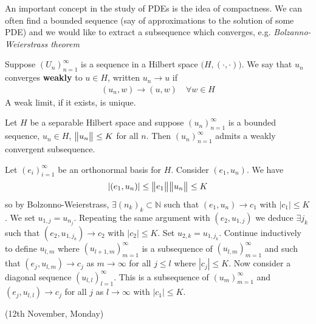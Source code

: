 \documentclass[12pt,a4paper]{report}
\newenvironment{proof}
{\begin{changemargin}{1cm}{0.5cm} 
	}%
	{\end{changemargin}
}
\begin{document}
An important concept in the study of PDEs is the idea of compactness. We can often find a bounded sequence (say of approximations to the solution of some PDE) and we would like to extract a subsequence which converges, e.g. \emph{Bolzanno-Weierstrass theorem}
\s

 Suppose $(U_n)_{n=1}^{\infty}$ is a sequence in a Hilbert space $\big( H,(\cdot,\cdot) \big)$. We say that $u_n$ converges \textbf{weakly} to $u\in H$, written $u_n \rightarrow u$ if
\begin{align*}
(u_n, w) \rightarrow (u,w) \quad \forall w\in H
\end{align*}
A weak limit, if it exists, is unique.
\s

\thm Let $H$ be a separable Hilbert space and suppose $(u_n)_{n=1}^{\infty}$ is a bounded sequence, $u_n \in H$, $\bigl\lVert u_n\bigr\rVert_{} \leq K$ for all $n$. Then $(u_n)_{n=1}^{\infty}$ admits a weakly convergent subsequence.
\begin{proof}
\pf Let $(e_i)_{i=1}^{\infty}$ be an orthonormal basis for $H$. Consider $(e_1, u_n)$. We have
\begin{align*}
|(e_1, u_n)| \leq \bigl\lVert e_1\bigr\rVert_{} \bigl\lVert u_n\bigr\rVert_{} \leq K
\end{align*}
so by Bolzonno-Weierstrass, $\exists (n_k)_{k} \subset \mathbb{N}$ such that $(e_1, u_n) \rightarrow c_1$ with $|c_1| \leq K$. We set $u_{1,j} = u_{n_j}$. Repeating the same argument with $(e_2, u_{1,j})$ we deduce $\exists j_k$ such that $(e_2, u_{1,j_k}) \rightarrow c_2$ with $|c_2| \leq K$. Set $u_{2,k} = u_{1,j_k}$. Continue inductively to define $u_{l,m}$ where $(u_{l+1,m})_{m=1}^{\infty}$ is a subsequence of $(u_{l,m})_{m=1}^{\infty}$ and such that $(e_j, u_{l,m}) \rightarrow c_j$ as $m\rightarrow \infty$ for all $j\leq l$ where $|c_j| \leq K$. Now consider a diagonal sequence $(u_{l,l})_{l=1}^{\infty}$. This is a subsequence of $(u_m)_{m=1}^{\infty}$ and $(e_j, u_{l,l}) \rightarrow c_j$ for all $j$ as $l\rightarrow \infty$ with $|c_1| \leq K$.
\end{proof}
\s

\newday

(12th November, Monday)
\s
\end{document}
